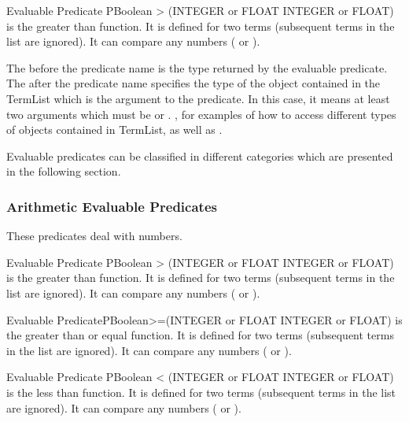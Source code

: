 \begin{typeep}{Evaluable Predicate} {PBoolean} {>} {(INTEGER or FLOAT INTEGER or FLOAT)}
is the greater than function. It is defined for two terms (subsequent
terms in the list are ignored). It can compare any numbers ( or
).
\end{typeep}

The  before the predicate name \code{>} is the type returned
by the evaluable predicate.  The 
after the predicate name specifies the type of the object contained in the
TermList which is the argument to the \code{>} predicate. In this case, it
means at least two arguments which must be  or 
.  , for examples of how to access
different types of objects contained in TermList, as well as .

Evaluable predicates can be classified in different categories which are
presented in the following section.



\subsubsection{Arithmetic Evaluable Predicates}

These predicates deal with numbers.

\begin{typeep}{Evaluable Predicate} {PBoolean} {>} {(INTEGER or FLOAT INTEGER or FLOAT)}
is the greater than function. It is defined for two terms (subsequent
terms in the list are ignored). It can compare any numbers ( or
).
\end{typeep}

\begin{typeep}{Evaluable Predicate}{PBoolean}{>=}{(INTEGER or FLOAT INTEGER or FLOAT)}
is the greater than or equal function. It is defined for two terms
(subsequent terms in the list are ignored). It can compare any numbers
( or ).
\end{typeep}

\begin{typeep}{Evaluable Predicate} {PBoolean} {<} {(INTEGER or FLOAT INTEGER or FLOAT)}
is the less than function. It is defined for two terms (subsequent terms
in the list are ignored). It can compare any numbers ( or ).
\end{typeep}

